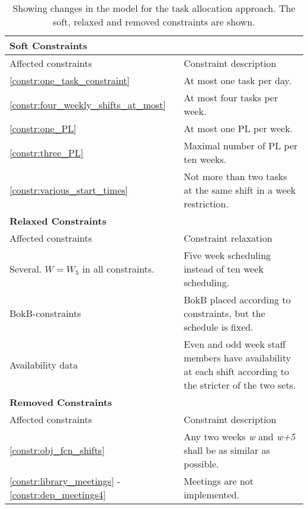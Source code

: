 \begin{table}[!h]
\centering
\caption{Showing changes in the model for the task allocation approach. The soft, relaxed and removed constraints are shown.}
\label{tab:task_constraints}
\begin{tabular}{|p{4cm}|p{7cm}|}
\hline
\multicolumn{2}{|l|}{\cellcolor{gray!90} \textbf{Soft Constraints}} \\
\hline 
\rowcolor{Gray} Affected constraints & Constraint description \\ \hline
\ref{constr:one_task_constraint} & At most one task per day.  \\ \hline
\ref{constr:four_weekly_shifts_at_most} & At most four tasks per week. \\ \hline
\ref{constr:one_PL} & At most one PL per week. \\ \hline
\ref{constr:three_PL} & Maximal number of PL per ten weeks. \\ \hline
\ref{constr:various_start_times} & Not more than two tasks at the same shift in a week restriction.  \\ \hline
\multicolumn{2}{|l|}{\cellcolor{gray!90} \textbf{Relaxed Constraints}} \\
\hline 
\rowcolor{Gray} Affected constraints & Constraint relaxation \\ \hline
Several. $W = W_5$ in all constraints. & Five week scheduling instead of ten week scheduling. \\ \hline
BokB-constraints & BokB placed according to constraints, but the schedule is fixed. \\ \hline
Availability data & Even and odd week staff members have availability at each shift according to the stricter of the two sets. \\ \hline
\multicolumn{2}{|l|}{\cellcolor{gray!90} \textbf{Removed Constraints}} \\
\hline 
\rowcolor{Gray} Affected constraints & Constraint description \\ \hline
\ref{constr:obj_fcn_shifts} & Any two weeks \textit{w} and \textit{w+5} shall be as similar as possible. \\ \hline
\ref{constr:library_meetings} - \ref{constr:dep_meetings4} & Meetings are not implemented. \\ \hline
\end{tabular}
\end{table}

